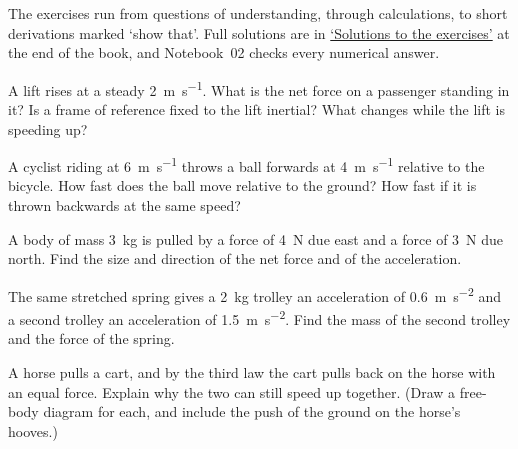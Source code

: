 \label{sec:ne-exercises}

The exercises run from questions of understanding, through calculations,
to short derivations marked `show that'. Full solutions are in
\hyperref[sec:ne-solutions]{`Solutions to the exercises'} at the end of
the book, and Notebook~02 checks every numerical answer.

\begin{exercise}[a lift]
\label{ex:ne-lift}
A lift rises at a steady \SI{2}{\metre\per\second}. What is the net force
on a passenger standing in it? Is a frame of reference fixed to the lift
inertial? What changes while the lift is speeding up?
\end{exercise}

\begin{exercise}[a cyclist]
\label{ex:ne-frames}
A cyclist riding at \SI{6}{\metre\per\second} throws a ball forwards at
\SI{4}{\metre\per\second} relative to the bicycle. How fast does the ball
move relative to the ground? How fast if it is thrown backwards at the
same speed?
\end{exercise}

\begin{exercise}
\label{ex:ne-net}
A body of mass \SI{3}{\kilogram} is pulled by a force of \SI{4}{\newton}
due east and a force of \SI{3}{\newton} due north. Find the size and
direction of the net force and of the acceleration.
\end{exercise}

\begin{exercise}
\label{ex:ne-mass}
The same stretched spring gives a \SI{2}{\kilogram} trolley an
acceleration of \SI{0.6}{\metre\per\second\squared} and a second trolley
an acceleration of \SI{1.5}{\metre\per\second\squared}. Find the mass of
the second trolley and the force of the spring.
\end{exercise}

\begin{exercise}
\label{ex:ne-horse}
A horse pulls a cart, and by the third law the cart pulls back on the
horse with an equal force. Explain why the two can still speed up
together. (Draw a free-body diagram for each, and include the push of the
ground on the horse's hooves.)
\end{exercise}

